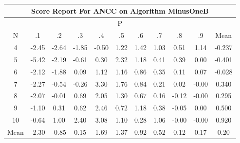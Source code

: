 \documentclass[11pt,a4paper]{report}
\begin{document}
\begin{longtable}{ | c || c | c | c | c | c | c | c | c | c || c |}
\hline
\multicolumn{11}{|c|}{ Score Report For ANCC on Algorithm MinusOneB} \\
\hline
\multicolumn{11}{|c|}{ P } \\
\hline
N & .1 & .2 & .3 & .4 & .5 & .6 & .7 & .8 & .9 & Mean\\
 \hline
 \hline
 \endhead
  4 &  \cellcolor[HTML]{FFBFBF} -2.45 &  \cellcolor[HTML]{FFBFBF} -2.64 &  \cellcolor[HTML]{FFCFCF} -1.85 &  \cellcolor[HTML]{FFEFEF} -0.50 &  \cellcolor[HTML]{DFDFFF} 1.22 &  \cellcolor[HTML]{DFDFFF} 1.42 &  \cellcolor[HTML]{E7E7FF} 1.03 &  \cellcolor[HTML]{EFEFFF} 0.51 &  \cellcolor[HTML]{DFDFFF} 1.14 & -0.237 \\
  5 &  \cellcolor[HTML]{FF7878} -5.42 &  \cellcolor[HTML]{FFC7C7} -2.19 &  \cellcolor[HTML]{FFEFEF} -0.61 &  \cellcolor[HTML]{F7F7FF} 0.30 &  \cellcolor[HTML]{C7C7FF} 2.32 &  \cellcolor[HTML]{DFDFFF} 1.18 &  \cellcolor[HTML]{F7F7FF} 0.41 &  \cellcolor[HTML]{F7F7FF} 0.39 &  \cellcolor[HTML]{FFFFFF} 0.00 & -0.401 \\
  6 &  \cellcolor[HTML]{FFC7C7} -2.12 &  \cellcolor[HTML]{FFCFCF} -1.88 &  \cellcolor[HTML]{FFFFFF} 0.09 &  \cellcolor[HTML]{DFDFFF} 1.12 &  \cellcolor[HTML]{DFDFFF} 1.16 &  \cellcolor[HTML]{E7E7FF} 0.86 &  \cellcolor[HTML]{F7F7FF} 0.35 &  \cellcolor[HTML]{FFFFFF} 0.11 &  \cellcolor[HTML]{FFFFFF} 0.07 & -0.028 \\
  7 &  \cellcolor[HTML]{FFC7C7} -2.27 &  \cellcolor[HTML]{FFEFEF} -0.54 &  \cellcolor[HTML]{FFF7F7} -0.26 &  \cellcolor[HTML]{AFAFFF} 3.30 &  \cellcolor[HTML]{CFCFFF} 1.76 &  \cellcolor[HTML]{E7E7FF} 0.84 &  \cellcolor[HTML]{F7F7FF} 0.21 &  \cellcolor[HTML]{FFFFFF} 0.02 &  \cellcolor[HTML]{FFFFFF} -0.00 & 0.340 \\
  8 &  \cellcolor[HTML]{FFC7C7} -2.07 &  \cellcolor[HTML]{FFFFFF} -0.01 &  \cellcolor[HTML]{EFEFFF} 0.69 &  \cellcolor[HTML]{CFCFFF} 2.05 &  \cellcolor[HTML]{DFDFFF} 1.30 &  \cellcolor[HTML]{EFEFFF} 0.67 &  \cellcolor[HTML]{F7F7FF} 0.16 &  \cellcolor[HTML]{FFFFFF} -0.12 &  \cellcolor[HTML]{FFFFFF} -0.00 & 0.295 \\
  9 &  \cellcolor[HTML]{FFE7E7} -1.10 &  \cellcolor[HTML]{F7F7FF} 0.31 &  \cellcolor[HTML]{EFEFFF} 0.62 &  \cellcolor[HTML]{BFBFFF} 2.46 &  \cellcolor[HTML]{EFEFFF} 0.72 &  \cellcolor[HTML]{DFDFFF} 1.18 &  \cellcolor[HTML]{F7F7FF} 0.38 &  \cellcolor[HTML]{FFFFFF} -0.05 &  \cellcolor[HTML]{FFFFFF} 0.00 & 0.500 \\
  10 &  \cellcolor[HTML]{FFEFEF} -0.64 &  \cellcolor[HTML]{E7E7FF} 1.00 &  \cellcolor[HTML]{BFBFFF} 2.40 &  \cellcolor[HTML]{AFAFFF} 3.08 &  \cellcolor[HTML]{E7E7FF} 1.10 &  \cellcolor[HTML]{F7F7FF} 0.28 &  \cellcolor[HTML]{E7E7FF} 1.06 &  \cellcolor[HTML]{FFFFFF} -0.00 &  \cellcolor[HTML]{FFFFFF} -0.00 & 0.920 \\
 \hline
 \hline
Mean &  \cellcolor[HTML]{FFC7C7} -2.30 &  \cellcolor[HTML]{FFE7E7} -0.85 &  \cellcolor[HTML]{FFFFFF} 0.15 &  \cellcolor[HTML]{D7D7FF} 1.69 &  \cellcolor[HTML]{DFDFFF} 1.37 &  \cellcolor[HTML]{E7E7FF} 0.92 &  \cellcolor[HTML]{EFEFFF} 0.52 &  \cellcolor[HTML]{FFFFFF} 0.12 &  \cellcolor[HTML]{F7F7FF} 0.17 &  \cellcolor[HTML]{F7F7FF} 0.20
\end{longtable}
\end{document}
